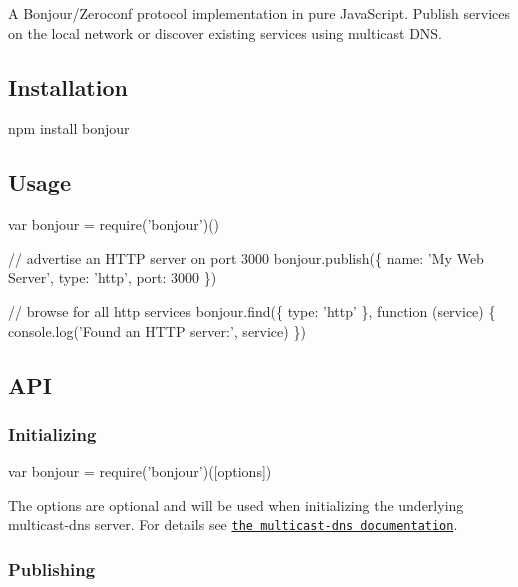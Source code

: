 A Bonjour/\+Zeroconf protocol implementation in pure Java\+Script. Publish services on the local network or discover existing services using multicast D\+NS.

\href{https://travis-ci.org/watson/bonjour}{\tt } \href{https://github.com/feross/standard}{\tt }

\subsection*{Installation}


\begin{DoxyCode}
npm install bonjour
\end{DoxyCode}


\subsection*{Usage}


\begin{DoxyCode}
var bonjour = require('bonjour')()

// advertise an HTTP server on port 3000
bonjour.publish(\{ name: 'My Web Server', type: 'http', port: 3000 \})

// browse for all http services
bonjour.find(\{ type: 'http' \}, function (service) \{
  console.log('Found an HTTP server:', service)
\})
\end{DoxyCode}


\subsection*{A\+PI}

\subsubsection*{Initializing}


\begin{DoxyCode}
var bonjour = require('bonjour')([options])
\end{DoxyCode}


The {\ttfamily options} are optional and will be used when initializing the underlying multicast-\/dns server. For details see \href{https://github.com/mafintosh/multicast-dns#mdns--multicastdnsoptions}{\tt the multicast-\/dns documentation}.

\subsubsection*{Publishing}

